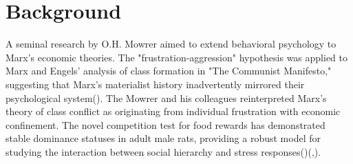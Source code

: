 \documentclass[english, a4paper, 11pt]{article}
\begin{document}
\section{Background}
A seminal research by O.H. Mowrer aimed to extend behavioral psychology to Marx’s economic theories. The "frustration-aggression" hypothesis was applied to Marx and Engels' analysis of class formation in "The Communist Manifesto," suggesting that Marx's materialist history inadvertently mirrored their psychological system(\cite{dollardFrustrationAggression1939}). The Mowrer and his colleagues  reinterpreted Marx’s theory of class conflict as originating from individual frustration with economic confinement. 
The novel competition test for food rewards has demonstrated stable dominance statuses in adult male rats, providing a robust model for studying the interaction between social hierarchy and stress responses(\cite{costaNovelCompetitionTest2021a})(,).
\end{document}
